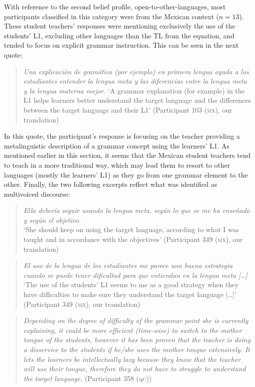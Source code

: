 \documentclass[output=paper]{../langscibook}
\begin{document}
With reference to the second belief profile, open-to-other-languages, most participants classified in this category were from the Mexican context ($n=13$). These student teachers’ responses were mentioning exclusively the use of the students’ L1, excluding other languages than the TL from the equation, and tended to focus on explicit grammar instruction. This can be seen in the next quote:

\begin{quote}
\emph{Una explicación de gramática (por ejemplo) en primera lengua ayuda a los estudiantes entender la lengua meta y las diferencias entre la lengua meta y la lengua materna mejor.}
\newpage\noindent
`A grammar explanation (for example) in the L1 helps learners better understand the target language and the differences between the target language and their L1' (Participant 103 (\textsc{mx}), our translation)
\end{quote}

In this quote, the participant’s response is focusing on the teacher providing a metalinguistic description of a grammar concept using the learners’ L1. As mentioned earlier in this section, it seems that the Mexican student teachers tend to teach in a more traditional way, which may lead them to resort to other languages (mostly the learners’ L1) as they go from one grammar element to the other. Finally, the two following excerpts reflect what was identified as multivoiced discourse:

\begin{quote}
\emph{Ella debería seguir usando la lengua meta, según lo que se me ha enseñado y según el objetivo.}\smallskip\\
`She should keep on using the target language, according to what I was taught and in accordance with the objectives' (Participant 349 (\textsc{mx}), our translation)
\end{quote}

\begin{quote}
\emph{El uso de la lengua de los estudiantes me parece una buena estrategia cuando se puede tener dificultad para que entiendan en la lengua meta […]}\smallskip\\
`The use of the students’ L1 seems to me as a good strategy when they have difficulties to make sure they understand the target language […]' (Participant 349 (\textsc{mx}), our translation)
\end{quote}

\begin{quote}
\emph{Depending on the degree of difficulty of the grammar point she is currently explaining, it could be more efficient (time-wise) to switch to the mother tongue of the students, however it has been proven that the teacher is doing a disservice to the students if he/she uses the mother tongue extensively. It lets the learners be intellectually lazy because they know that the teacher will use their tongue, therefore they do not have to struggle to understand the target language.} (Participant 358 (\textsc{qc}))
\end{quote}
\end{document}
